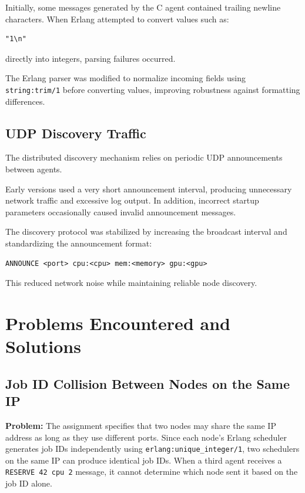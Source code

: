 \documentclass[12pt,a4paper]{article}
\begin{document}
Initially, some messages generated by the C agent contained trailing newline characters. When Erlang attempted to convert values such as:

\begin{lstlisting}
"1\n"
\end{lstlisting}

directly into integers, parsing failures occurred.

The Erlang parser was modified to normalize incoming fields using \texttt{string:trim/1} before converting values, improving robustness against formatting differences.

\subsection{UDP Discovery Traffic}

The distributed discovery mechanism relies on periodic UDP announcements between agents.

Early versions used a very short announcement interval, producing unnecessary network traffic and excessive log output. In addition, incorrect startup parameters occasionally caused invalid announcement messages.

The discovery protocol was stabilized by increasing the broadcast interval and standardizing the announcement format:

\begin{lstlisting}
ANNOUNCE <port> cpu:<cpu> mem:<memory> gpu:<gpu>
\end{lstlisting}

This reduced network noise while maintaining reliable node discovery.

\section{Problems Encountered and Solutions}

\subsection{Job ID Collision Between Nodes on the Same IP}

\textbf{Problem:} The assignment specifies that two nodes may share the same IP address as long as they use different ports. Since each node's Erlang scheduler generates job IDs independently using \texttt{erlang:unique\_integer/1}, two schedulers on the same IP can produce identical job IDs. When a third agent receives a \texttt{RESERVE 42 cpu 2} message, it cannot determine which node
sent it based on the job ID alone.
\end{document}
